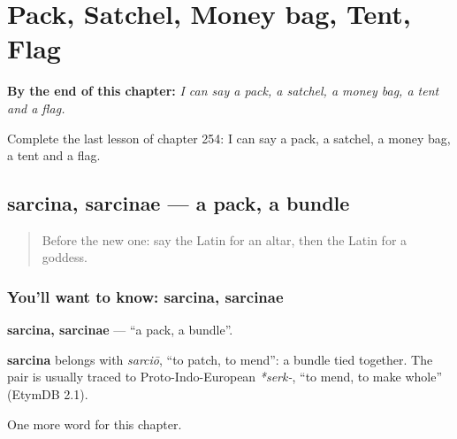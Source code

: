 
\chapter{Pack, Satchel, Money bag, Tent, Flag}
\label{ch:la-pack-satchel-money-bag-tent-flag}

\begin{chapteropening}
\textbf{By the end of this chapter:} \emph{I can say a pack, a satchel, a money bag, a tent and a flag.}

Complete the last lesson of chapter 254: I can say a pack, a satchel, a money bag, a tent and a flag.
\end{chapteropening}

\section[sarcina, sarcinae]{sarcina, sarcinae — a pack, a bundle}

\label{lesson:LA-C254-sarcina}



\begin{quote}
Before the new one: say the Latin for an altar, then the Latin for a goddess.
\end{quote}

\subsection*{You'll want to know: sarcina, sarcinae}
\textbf{sarcina, sarcinae} — \textquotedblleft{}a pack, a bundle\textquotedblright{}.

\begin{cousinweb}
\textbf{sarcina} belongs with \emph{sarciō}, \textquotedblleft{}to patch, to mend\textquotedblright{}: a bundle tied together. The pair is usually traced to Proto-Indo-European \emph{*serk-}, \textquotedblleft{}to mend, to make whole\textquotedblright{} (EtymDB 2.1).
\end{cousinweb}

\begin{grammarlens}[title={What you've built}]
One more word for this chapter.
\end{grammarlens}

